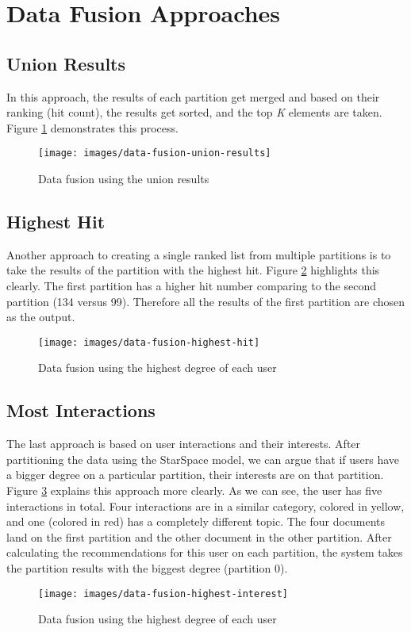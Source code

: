 \section{Data Fusion Approaches}

\subsection{Union Results}

In this approach, the results of each partition get merged and based on their ranking (hit count), the results get sorted, and the top \emph{K} elements are taken. Figure \ref{fig:data-fusion-union-results} demonstrates this process.


\begin{figure}[!h]
	\centering
	\texttt{[image: images/data-fusion-union-results]}
	\caption{Data fusion using the union results}
	\label{fig:data-fusion-union-results}
\end{figure}

\subsection{Highest Hit}
Another approach to creating a single ranked list from multiple partitions is to take the results of the partition with the highest hit. Figure \ref{fig:data-fusion-highest-hit} highlights this clearly. The first partition has a higher hit number comparing to the second partition (134 versus 99). Therefore all the results of the first partition are chosen as the output.
\begin{figure}[!h]
	\centering
	\texttt{[image: images/data-fusion-highest-hit]}
	\caption{Data fusion using the highest degree of each user}
	\label{fig:data-fusion-highest-hit}
\end{figure}

\subsection{Most Interactions}
The last approach is based on user interactions and their interests. After partitioning the data using the StarSpace model, we can argue that if users have a bigger degree on a particular partition, their interests are on that partition. Figure \ref{fig:data-fusion-highest-ineterest} explains this approach more clearly. As we can see, the user has five interactions in total. Four interactions are in a similar category, colored in yellow, and one (colored in red) has a completely different topic. The four documents land on the first partition and the other document in the other partition. After calculating the recommendations for this user on each partition, the system takes the partition results with the biggest degree (partition 0).
\begin{figure}[!h]
	\centering
	\texttt{[image: images/data-fusion-highest-interest]}
	\caption{Data fusion using the highest degree of each user}
	\label{fig:data-fusion-highest-ineterest}
\end{figure}

